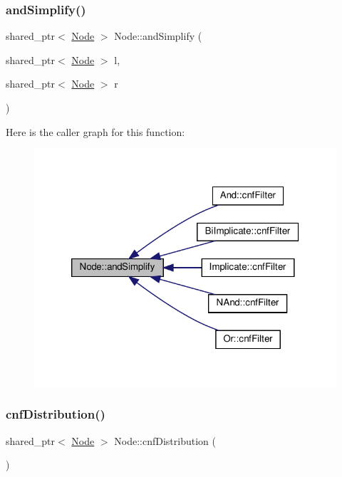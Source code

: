 \subsubsection{\texorpdfstring{and\+Simplify()}{andSimplify()}}
{\footnotesize\ttfamily shared\+\_\+ptr$<$ \hyperlink{class_node}{Node} $>$ Node\+::and\+Simplify (\begin{DoxyParamCaption}\item[{shared\+\_\+ptr$<$ \hyperlink{class_node}{Node} $>$}]{l,  }\item[{shared\+\_\+ptr$<$ \hyperlink{class_node}{Node} $>$}]{r }\end{DoxyParamCaption})\hspace{0.3cm}{\ttfamily [protected]}}

Here is the caller graph for this function\+:
\nopagebreak
\begin{figure}[H]
\begin{center}
\leavevmode
\includegraphics[width=320pt]{dc/d8f/class_node_afd9769d942984448aa8e541ada73b289_icgraph}
\end{center}
\end{figure}
\mbox{\label{class_node_ae68e5138f0c1a6c79912e21bc8f39d48}} 
\subsubsection{\texorpdfstring{cnf\+Distribution()}{cnfDistribution()}}
{\footnotesize\ttfamily shared\+\_\+ptr$<$ \hyperlink{class_node}{Node} $>$ Node\+::cnf\+Distribution (\begin{DoxyParamCaption}{ }\end{DoxyParamCaption})\hspace{0.3cm}{\ttfamily [virtual]}}



